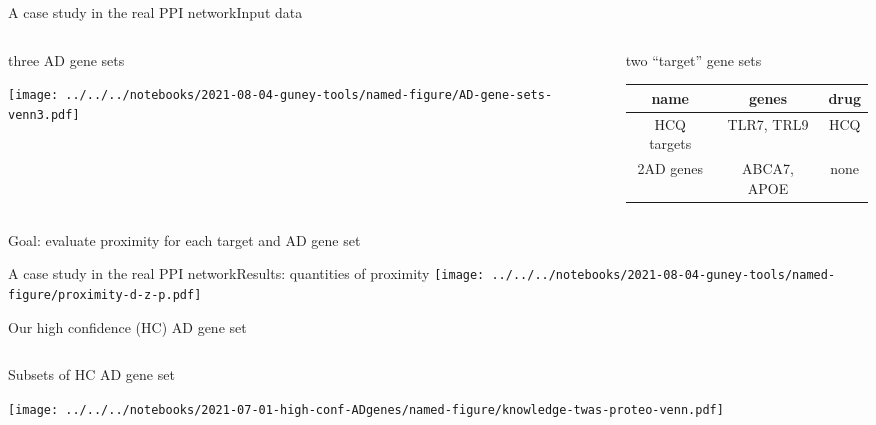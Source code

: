 \documentclass{beamer}
\begin{document}
\begin{frame}{A case study in the real PPI network}{Input data}
\begin{columns}[t]
\begin{column}{0.5\textwidth}

\begin{center}
three AD gene sets
\end{center}

\texttt{[image: ../../../notebooks/2021-08-04-guney-tools/named-figure/AD-gene-sets-venn3.pdf]}
\end{column}

\begin{column}{0.5\textwidth}

\begin{center}
two ``target'' gene sets
\end{center}
	\footnotesize
\begin{tabular}{|c|c|c|}
\hline
name & genes & drug \\
\hline
HCQ targets & TLR7, TRL9 & HCQ \\
2AD genes & ABCA7, APOE  & none \\
\hline
\end{tabular}
\end{column}
\end{columns}
\begin{center}
Goal: evaluate proximity for each target and AD gene set
\end{center}
\end{frame}

\begin{frame}{A case study in the real PPI network}{Results: quantities of proximity}
\texttt{[image: ../../../notebooks/2021-08-04-guney-tools/named-figure/proximity-d-z-p.pdf]}
\end{frame}

\begin{frame}{Our high confidence (HC) AD gene set}
\begin{columns}[t]
\begin{column}{0.5\textwidth}
Subsets of HC AD gene set

\texttt{[image: ../../../notebooks/2021-07-01-high-conf-ADgenes/named-figure/knowledge-twas-proteo-venn.pdf]}
\end{column}

\begin{column}{0.5\textwidth}

\end{column}
\end{columns}
\end{frame}
\end{document}
